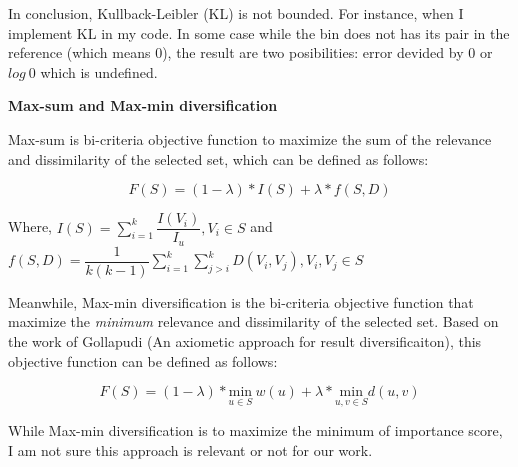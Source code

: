 \documentclass[fleqn]{article}
\begin{document}
In conclusion, Kullback-Leibler (KL) is not bounded. For instance, when I implement KL in my code. In some case while the bin does not has its pair in the reference (which means 0), the result are two posibilities: error devided by 0 or $ log\ 0 $ which is undefined. 
\newline

\textbf{Max-sum and Max-min diversification}
\newline

Max-sum is bi-criteria objective function to maximize the sum of the relevance and dissimilarity of the selected set, which can be defined as follows:

\begin{equation}
F\left(S\right) =  \left(1-\lambda\right) * I\left(S\right) + \lambda * f\left(S,D\right)
\label{objectif_function}
\end{equation}

Where, 
$ I\left(S\right)= \sum_{i=1}^{k} \dfrac{I(V_i )}{I_u}, V_i  \in S $ and $ f\left(S,D\right)= \dfrac{1}{k\left(k-1\right)}  \sum_{i=1}^{k} \sum_{j>i}^{k} D\left(V_i,V_j\right) ,V_i,V_j  \in S $
\newline

Meanwhile, Max-min diversification is the bi-criteria objective function that maximize the \textit{minimum} relevance and dissimilarity of the selected set. Based on the work of Gollapudi (An axiometic approach for result diversificaiton), this objective function can be defined as follows: 

\begin{equation}
F\left(S\right) = (1-\lambda) * \underset{u \in S} {\mathrm{min}} \ w\left(u\right)  + \lambda * \underset{u,v \in S} {\mathrm{min}} d\left(u,v\right)
\end{equation}

While Max-min diversification is to maximize the minimum of importance score, I am not sure this approach is relevant or not for our work. 
\end{document}
